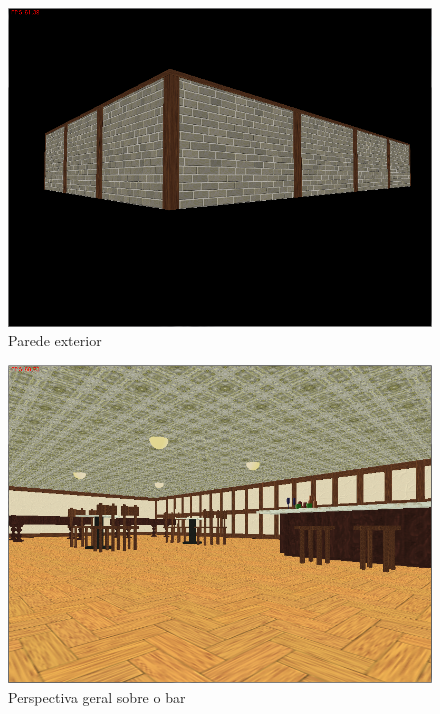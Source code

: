 \documentclass[a5paper,onecolumn, 11pt]{article}
\begin{document}
\newpage
\begin{figure}[!htb]
    \centering
    \includegraphics[scale=0.5]{bar9.png}
    \caption{Parede exterior}
\end{figure}
\begin{figure}[!htb]
    \centering
    \includegraphics[scale=0.5]{bar1.png}
    \caption{Perspectiva geral sobre o bar}
\end{figure}
\end{document}
